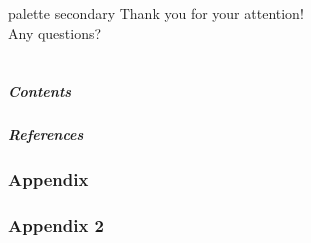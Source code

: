 \documentclass[%
aspectratio=169,%
xcolor=table,%
]{beamer}
\begin{document}
    \begin{frame}
        [endframe,t]
        \centering\inserttitlegraphic\par
        \vfill
        \begin{beamercolorbox}[sep=4pt,center,rounded=true,shadow=true]{palette secondary}
            Thank you for your attention!\\
            Any questions?
        \end{beamercolorbox}
    \end{frame}

    \part{}
    \begin{frame}
        \frametitle{Contents}
        \tableofcontents
    \end{frame}

    \backupbegin
    \begin{frame}
        \frametitle{References}
        \printbibliography
    \end{frame}
    \section{Appendix}
    
    \section{Appendix 2}
    
    \backupend
 
\end{document}
